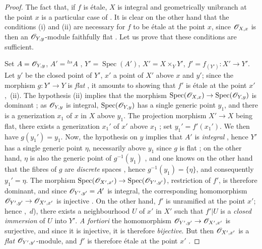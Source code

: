 \begin{proof}
The fact that, if $f$ is \'etale, $X$ is integral and geometrically unibranch at the point $x$ is a particular case of .
It is clear on the other hand that the conditions (i) and (ii) are necessary for $f$ to be \'etale at the point $x$, since $\mathscr{O}_{X,x}$ is then an $\mathscr{O}_{Y,y}$-module faithfully flat .
Let us prove that these conditions are sufficient.

Set $A=\mathscr{O}_{Y,y}$, $A'={}^{hs}A$ , $Y'=\operatorname{Spec}(A')$, $X'=X\times_{Y}Y'$, $f'=f_{(Y')}:X'\to Y'$.
Let $y'$ be the closed point of $Y'$, $x'$ a point of $X'$ above $x$ and $y'$; since the morphism $g:Y'\to Y$ is \emph{flat} , it amounts to showing that $f'$ is \'etale at the point $x'$ ,~(ii).
The hypothesis (ii) implies that the morphism $\operatorname{Spec}(\mathscr{O}_{X,x})\to\operatorname{Spec}(\mathscr{O}_{Y,y})$ is dominant ; as $\mathscr{O}_{Y,y}$ is integral, $\operatorname{Spec}(\mathscr{O}_{Y,y})$ has a single generic point $y_1$, and there is a generization $x_1$ of $x$ in $X$ above $y_1$.
The projection morphism $X'\to X$ being flat, there exists a generization $x_1'$ of $x'$ above $x_1$ ; set $y_1'=f'(x_1')$. We then have $g(y_1')=y_1$.
Now, the hypothesis on $y$ implies that $A'$ is \emph{integral} , hence $Y'$ has a single generic point $\eta$, necessarily above $y_1$ since $g$
is flat ; on the other hand, $\eta$ is also the generic point of $g^{-1}(y_1)$ , and one knows on the other hand that the fibres of $g$ are \emph{discrete} spaces , hence $g^{-1}(y_1)=\{\eta\}$, and consequently $y_1'=\eta$.
The morphism $\operatorname{Spec}(\mathscr{O}_{X',x'})\to\operatorname{Spec}(\mathscr{O}_{Y',y'})$, restriction of $f'$, is therefore dominant, and since $\mathscr{O}_{Y',y'}=A'$ is integral, the corresponding homomorphism $\mathscr{O}_{Y',y'}\to\mathscr{O}_{X',x'}$ is injective .
On the other hand, $f'$ is unramified at the point $x'$; hence ,~$d$), there exists a neighbourhood $U$ of $x'$ in $X'$ such that $f'|U$ is a \emph{closed immersion} of $U$ into $Y'$.
\emph{A fortiori} the homomorphism $\mathscr{O}_{Y',y'}\to\mathscr{O}_{X',x'}$ is surjective, and since it is injective, it is therefore \emph{bijective}.
But then $\mathscr{O}_{X',x'}$ is a \emph{flat} $\mathscr{O}_{Y',y'}$-module, and $f'$ is therefore \'etale at the point $x'$ .


\end{proof}

